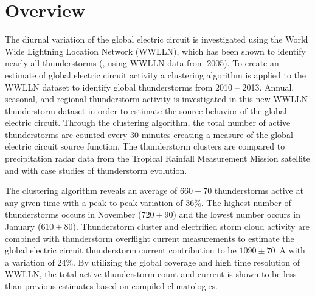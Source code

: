 \section{Overview}

The diurnal variation of the global electric circuit is investigated using the World Wide Lightning Location Network (WWLLN), which has been shown to identify nearly all thunderstorms (\citet{Jacobson2006c}, using WWLLN data from 2005).
To create an estimate of global electric circuit activity a clustering algorithm is applied to the WWLLN dataset to identify global thunderstorms from 2010 -- 2013.
Annual, seasonal, and regional thunderstorm activity is investigated in this new WWLLN thunderstorm dataset in order to estimate the source behavior of the global electric circuit.
Through the clustering algorithm, the total number of active thunderstorms are counted every 30 minutes creating a measure of the global electric circuit source function.
The thunderstorm clusters are compared to precipitation radar data from the Tropical Rainfall Measurement Mission satellite and with case studies of thunderstorm evolution.

The clustering algorithm reveals an average of $660 \pm 70$ thunderstorms active at any given time with a peak-to-peak variation of 36\%.
The highest number of thunderstorms occurs in November ($720 \pm 90$) and the lowest number occurs in January ($610 \pm 80$).
Thunderstorm cluster and electrified storm cloud activity are combined with thunderstorm overflight current measurements to estimate the global electric circuit thunderstorm current contribution to be $1090 \pm 70$~A with a variation of 24\%.
By utilizing the global coverage and high time resolution of WWLLN, the total active thunderstorm count and current is shown to be less than previous estimates based on compiled climatologies.

